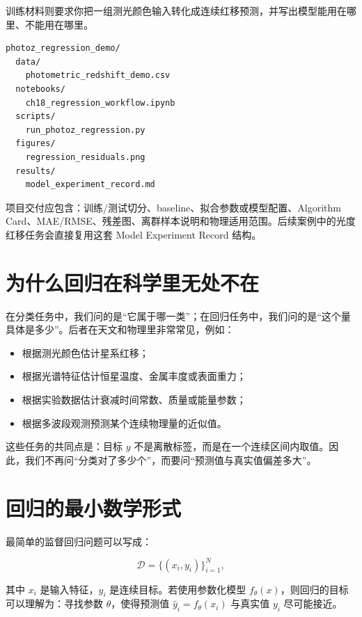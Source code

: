 训练材料则要求你把一组测光颜色输入转化成连续红移预测，并写出模型能用在哪里、不能用在哪里。

\begin{examplebox}[最小回归项目结构]
\begin{lstlisting}[style=terminal]
photoz_regression_demo/
  data/
    photometric_redshift_demo.csv
  notebooks/
    ch18_regression_workflow.ipynb
  scripts/
    run_photoz_regression.py
  figures/
    regression_residuals.png
  results/
    model_experiment_record.md
\end{lstlisting}
\end{examplebox}

项目交付应包含：训练/测试切分、baseline、拟合参数或模型配置、Algorithm Card、MAE/RMSE、残差图、离群样本说明和物理适用范围。后续案例中的光度红移任务会直接复用这套 Model Experiment Record 结构。

\section{为什么回归在科学里无处不在}

在分类任务中，我们问的是“它属于哪一类”；在回归任务中，我们问的是“这个量具体是多少”。后者在天文和物理里非常常见，例如：

\begin{itemize}
    \item 根据测光颜色估计星系红移；
    \item 根据光谱特征估计恒星温度、金属丰度或表面重力；
    \item 根据实验数据估计衰减时间常数、质量或能量参数；
    \item 根据多波段观测预测某个连续物理量的近似值。
\end{itemize}

这些任务的共同点是：目标 $y$ 不是离散标签，而是在一个连续区间内取值。因此，我们不再问“分类对了多少个”，而要问“预测值与真实值偏差多大”。

\section{回归的最小数学形式}

最简单的监督回归问题可以写成：

\[
\mathcal{D} = \{(x_i, y_i)\}_{i=1}^{N},
\]

其中 $x_i$ 是输入特征，$y_i$ 是连续目标。若使用参数化模型 $f_\theta(x)$，则回归的目标可以理解为：寻找参数 $\theta$，使得预测值 $\hat{y}_i = f_\theta(x_i)$ 与真实值 $y_i$ 尽可能接近。

